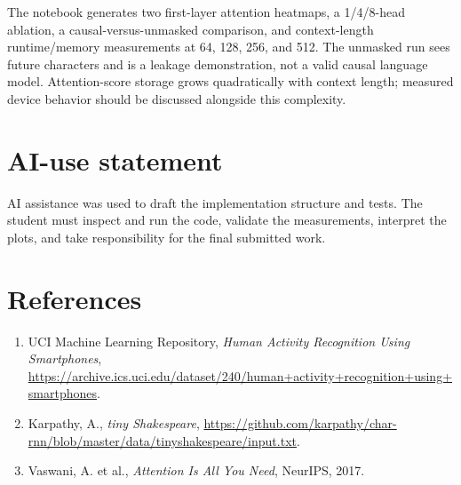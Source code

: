 \documentclass[11pt,a4paper]{article}
\begin{document}
The notebook generates two first-layer attention heatmaps, a 1/4/8-head ablation, a causal-versus-unmasked comparison, and context-length runtime/memory measurements at 64, 128, 256, and 512. The unmasked run sees future characters and is a leakage demonstration, not a valid causal language model. Attention-score storage grows quadratically with context length; measured device behavior should be discussed alongside this complexity.

\section*{AI-use statement}
AI assistance was used to draft the implementation structure and tests. The student must inspect and run the code, validate the measurements, interpret the plots, and take responsibility for the final submitted work.

\section*{References}
\begin{enumerate}
\item UCI Machine Learning Repository, \emph{Human Activity Recognition Using Smartphones}, \url{https://archive.ics.uci.edu/dataset/240/human+activity+recognition+using+smartphones}.
\item Karpathy, A., \emph{tiny Shakespeare}, \url{https://github.com/karpathy/char-rnn/blob/master/data/tinyshakespeare/input.txt}.
\item Vaswani, A. et al., \emph{Attention Is All You Need}, NeurIPS, 2017.
\end{enumerate}
\end{document}
